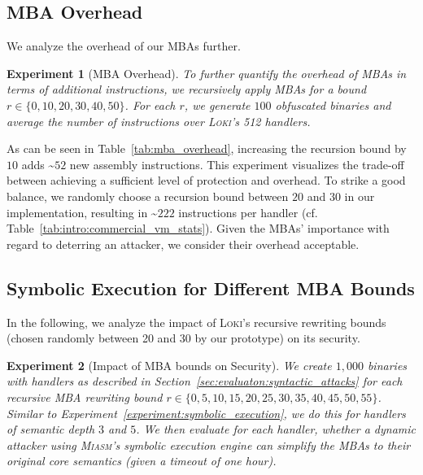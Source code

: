 \documentclass[letterpaper,twocolumn,10pt]{article}
\newcommand{\ex}[1]{Experiment~\ref{#1}}
\theoremstyle{customexample}
\theoremstyle{customexperiment}
\newtheorem{experiment}{Experiment}
\newcommand{\loki}{\textsc{Loki}\xspace}
\newcommand{\miasm}{\textsc{Miasm}\xspace}
\begin{document}
\subsection{MBA Overhead}\label{sec:appendix:mba_overhead}
We analyze the overhead of our MBAs further.

\begin{experiment}[MBA Overhead]\label{experiment:benchmarking:mba_bounds}
To further quantify the overhead of MBAs in terms of additional instructions, we recursively apply MBAs for a bound $r \in\{0, 10, 20, 30, 40, 50\}$. For each $r$, we generate $100$ obfuscated binaries and average the number of instructions over \loki's 512 handlers.
\end{experiment}

\begin{table}[htb]
\centering
\caption{Average number of assembly instructions per handler for various recursion bounds.}
\label{tab:mba_overhead} \end{table}

As can be seen in Table~\ref{tab:mba_overhead}, increasing the recursion bound by $10$ adds \textasciitilde$52$ new assembly instructions.
This experiment visualizes the trade-off between achieving a sufficient level of protection and overhead. To strike a good balance, we randomly choose a recursion bound between $20$ and $30$ in our implementation, resulting in \textasciitilde$222$ instructions per handler (cf. Table~\ref{tab:intro:commercial_vm_stats}). Given the MBAs' importance with regard to deterring an attacker, we consider their overhead acceptable.


\subsection{Symbolic Execution for Different MBA Bounds}\label{sec:appendix:se_mba_bounds}

In the following, we analyze the impact of \loki's recursive rewriting bounds (chosen randomly between 20 and 30 by our prototype) on its security.

\begin{experiment}[Impact of MBA bounds on Security]
We create $1,000$ binaries with handlers as described in Section~\ref{sec:evaluaton:syntactic_attacks} for each recursive MBA rewriting bound $r \in\{0, 5, 10, 15, 20, 25, 30, 35, 40, 45, 50, 55\}$. 
Similar to \ex{experiment:symbolic_execution}, we do this for handlers of semantic depth $3$ and $5$.
We then evaluate for each handler, whether a dynamic attacker using \miasm's symbolic execution engine can simplify the MBAs to their original core semantics (given a timeout of one hour).
\end{experiment}
\end{document}
